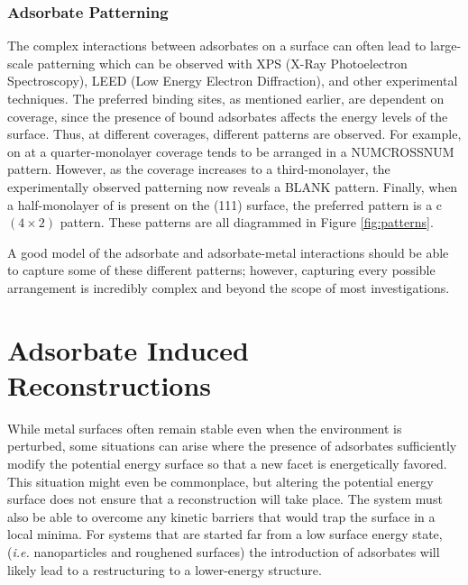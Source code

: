 \subsubsection{Adsorbate Patterning}
The complex interactions between adsorbates on a surface can often lead to
large-scale patterning which can be observed with XPS (X-Ray Photoelectron
Spectroscopy), LEED (Low Energy Electron Diffraction), and other experimental
techniques. The preferred binding sites, as mentioned earlier, are dependent on
coverage, since the presence of bound adsorbates affects the energy levels of
the surface. Thus, at different coverages, different patterns are observed. For
example,  on  at a quarter-monolayer coverage tends to be
arranged in a NUMCROSSNUM pattern. However, as the coverage increases to a
third-monolayer, the experimentally observed patterning now reveals a BLANK
pattern. Finally, when a half-monolayer of  is present on the (111)
surface, the preferred pattern is a c$(4\times2)$ pattern. These patterns are
all diagrammed in Figure \ref{fig:patterns}.

A good model of the adsorbate and adsorbate-metal interactions should be able
to capture some of these different patterns; however, capturing every possible
arrangement is incredibly complex and beyond the scope of most
investigations.

\section{Adsorbate Induced Reconstructions}

While metal surfaces often remain stable even when the environment is
perturbed, some situations can arise where the presence of adsorbates
sufficiently modify the potential energy surface so that a new facet is
energetically favored. This situation might even be commonplace, but altering
the potential energy surface does not ensure that a reconstruction will take
place. The system must also be able to overcome any kinetic barriers that would
trap the surface in a local minima.  For systems that are started far from a
low surface energy state, ({\em i.e.} nanoparticles and
roughened surfaces) the introduction of adsorbates will likely lead to a
restructuring to a lower-energy structure. 

